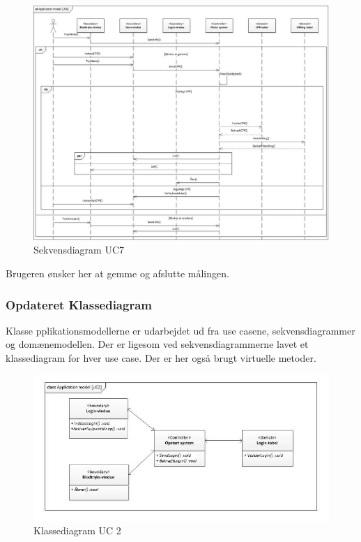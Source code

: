 \begin{figure}[H]
	\includegraphics[width=1\textwidth]{Figurer/ISE/sdAppModelUC7}
	\caption{Sekvensdiagram UC7}
	\label{sd UC7}
\end{figure}

Brugeren ønsker her at gemme og afslutte målingen. 

\subsubsection{Opdateret Klassediagram}
Klasse pplikationsmodellerne er udarbejdet ud fra use casene, sekvensdiagrammer og domænemodellen. Der er ligesom ved sekvensdiagrammerne lavet et klassediagram for hver use case. Der er her også brugt virtuelle metoder. 

\begin{figure}[H]
	\centering
	\includegraphics[width=1\textwidth]{Figurer/ISE/classAppModelUC2}
	\caption{Klassediagram UC 2}
	\label{classApp UC2}
\end{figure}

